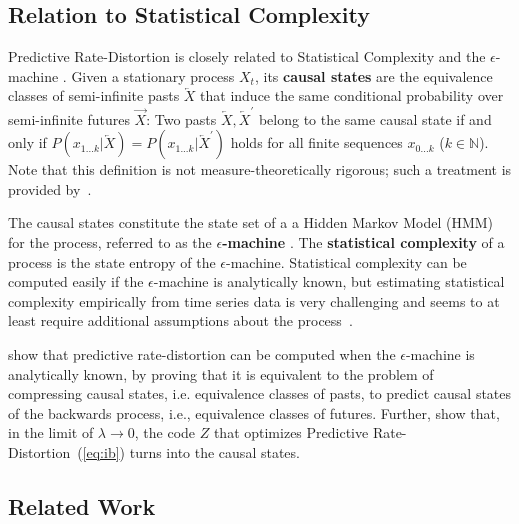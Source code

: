 \documentclass[entropy,article,submit,moreauthors,pdftex,10pt,a4paper]{Definitions/mdpi}
\newcommand{\future}{\overrightarrow{X}}
\newcommand{\past}{\overleftarrow{X}}
\newcommand{\key}{\textbf}
\begin{document}
\subsection{Relation to Statistical Complexity}\label{sec:complexity}

Predictive Rate-Distortion is closely related to Statistical Complexity and the $\epsilon$-machine \citep{crutchfield-inferring-1989,Grassberger1986}. 
Given a stationary process $X_t$, its \key{causal states} are the equivalence classes of semi-infinite pasts $\past$ that induce the same conditional probability over semi-infinite futures $\future$:
Two pasts $\past, \past^\prime$ belong to the same causal state if and only if $P(x_{1...k}|\past) = P(x_{1...k}|\past^\prime)$ holds for all finite sequences $x_{0...k}$ ($k \in \mathbb{N}$).
Note that this definition is not measure-theoretically rigorous; such a treatment is provided by~\citet{lohr-properties-2009}.

The causal states constitute the state set of a a Hidden Markov Model (HMM) for the process, referred to as the \key{$\epsilon$-machine}  \citep{crutchfield-inferring-1989}.
The \key{statistical complexity} of a process is the state entropy of the $\epsilon$-machine.
Statistical complexity can be computed easily if the $\epsilon$-machine is analytically known, but estimating statistical complexity empirically from time series data is very challenging and seems to at least require additional assumptions about the process~\citep{clarke2003application}.

\citet{marzen-predictive-2016} show that predictive rate-distortion can be computed when the $\epsilon$-machine is analytically known, by proving that it is equivalent to the problem of compressing causal states, i.e. equivalence classes of pasts, to predict causal states of the backwards process, i.e., equivalence classes of futures.
Further, \cite{still-optimal-2010} show that, in the limit of $\lambda \rightarrow 0$, the code $Z$ that optimizes Predictive Rate-Distortion~(\ref{eq:ib}) turns into the causal states.



\subsection{Related Work}
\end{document}
